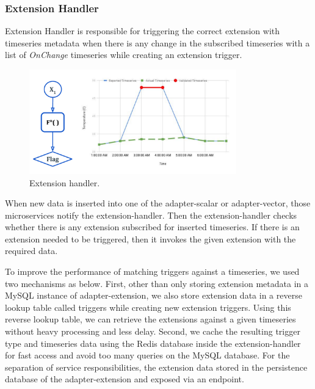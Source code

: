 \subsubsection{Extension Handler}

Extension Handler is responsible for triggering the correct extension with timeseries metadata when there is any change in the subscribed timeseries with a list of \emph{OnChange} timeseries while creating an extension trigger.

\begin{figure}[htp]
    \centering
    \includegraphics[width=0.8\textwidth]{method/data_preprocess/validation.pdf}
    \caption{Extension handler.}
    \label{fi:extension_handler}
\end{figure}

When new data is inserted into one of the adapter-scalar or adapter-vector, those microservices notify the extension-handler. Then the extension-handler checks whether there is any extension subscribed for inserted timeseries. If there is an extension needed to be triggered, then it invokes the given extension with the required data.

To improve the performance of matching triggers against a timeseries, we used two mechanisms as below. First, other than only storing extension metadata in a MySQL instance of adapter-extension, we also store extension data in a reverse lookup table called triggers while creating new extension triggers. Using this reverse lookup table, we can retrieve the extensions against a given timeseries without heavy processing and less delay. Second, we cache the resulting trigger type and timeseries data using the Redis database inside the extension-handler for fast access and avoid too many queries on the MySQL database. For the separation of service responsibilities, the extension data stored in the persistence database of the adapter-extension and exposed via an endpoint.

